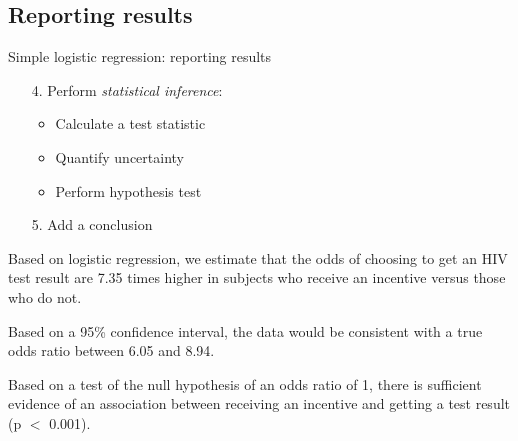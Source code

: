 \documentclass[10pt,t]{beamer}
\begin{document}
\subsection{Reporting results}

\begin{frame}{Simple logistic regression: reporting results}
	\begin{enumerate}
		\item[4.] Perform \textit{statistical inference}:
		\begin{itemize}
			\item Calculate a test statistic
			\item Quantify uncertainty
			\item Perform hypothesis test
		\end{itemize}
		\item[5.] Add a conclusion
	\end{enumerate}

\medskip

	Based on logistic regression, we estimate that the odds of choosing to get an HIV test result are 7.35 times higher in subjects who receive an incentive versus those who do not. 
	
	\medskip
	
	Based on a 95\% confidence interval, the data would be consistent with a true odds ratio between 6.05 and 8.94. 
	
	\medskip
	
	Based on a test of the null hypothesis of an odds ratio of 1, there is sufficient evidence of an association between receiving an incentive and getting a test result (p $<$ 0.001). 
\end{frame}
\end{document}
